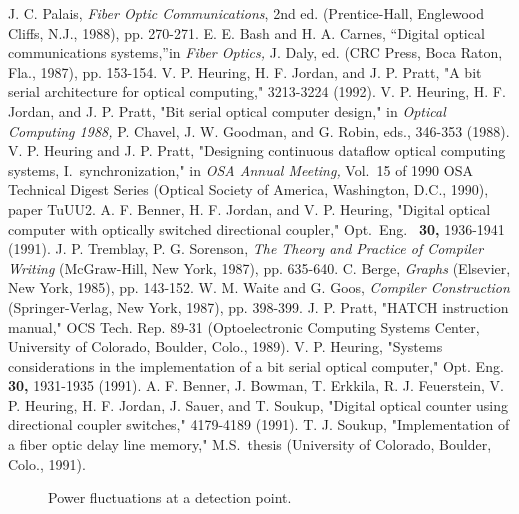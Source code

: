\begin{references}
 J. C. Palais, {\it Fiber Optic Communications}, 2nd ed.
(Prentice-Hall, Englewood Cliffs, N.J., 1988), pp. 270-271.
 E. E. Bash and H. A. Carnes, ``Digital optical communications
systems,''in {\it Fiber Optics,} J. Daly, ed. (CRC Press, Boca Raton, Fla.,
1987), pp. 153-154.
 V. P. Heuring, H. F. Jordan, and J. P. Pratt, "A bit serial
architecture for optical computing,"  3213-3224 (1992).
 V. P. Heuring, H. F. Jordan, and J. P. Pratt, "Bit serial
optical computer design," in {\it Optical Computing 1988,} P. Chavel, J.
W. Goodman, and G. Robin, eds.,  346-353 (1988).
 V. P. Heuring and J. P. Pratt, "Designing continuous dataflow
optical computing systems, I.\ synchronization," in {\it OSA Annual
Meeting,} Vol.\ 15 of 1990 OSA Technical Digest Series (Optical Society of
America, Washington, D.C., 1990), paper TuUU2.
 A. F. Benner, H. F. Jordan, and V. P. Heuring, "Digital optical
computer with optically switched directional coupler," Opt.\ Eng.\ {\bf
30,} 1936-1941 (1991).
 J. P. Tremblay, P. G. Sorenson, {\it The Theory and Practice of
Compiler Writing} (McGraw-Hill, New York, 1987), pp. 635-640.
 C. Berge, {\it Graphs} (Elsevier, New York, 1985), pp. 143-152.
 W. M. Waite and G. Goos, {\it Compiler Construction}
(Springer-Verlag, New York, 1987), pp. 398-399.
 J. P. Pratt, "HATCH instruction manual,"  OCS Tech. Rep. 89-31
(Optoelectronic Computing Systems Center, University of Colorado,  Boulder,
Colo., 1989).
 V. P. Heuring, "Systems considerations in the implementation
of a bit serial optical computer," Opt. Eng. {\bf 30,} 1931-1935 (1991).
 A. F. Benner, J. Bowman, T. Erkkila, R. J. Feuerstein, V. P.
Heuring, H. F. Jordan, J. Sauer, and T. Soukup, "Digital optical counter
using directional coupler switches,"  4179-4189 (1991).
 T. J. Soukup, "Implementation of a fiber optic delay line
memory," M.S.\ thesis (University of Colorado, Boulder, Colo., 1991).
\end{references}
\begin{figure}
\caption{ Power fluctuations at a detection point.} \end{figure}

